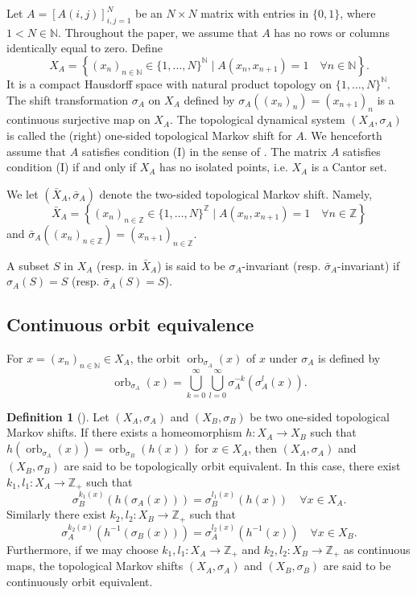 \documentclass[11pt]{article}
\theoremstyle{definition}
\newtheorem{definition}[theorem]{Definition}
\numberwithin{equation}{section}
\newcommand{\orb}{\operatorname{orb}}
\newcommand{\N}{\mathbb{N}}
\newcommand{\Z}{\mathbb{Z}}
\begin{document}
Let $A=[A(i,j)]_{i,j=1}^N$ be an $N\times N$ matrix with entries in $\{0,1\}$, 
where $1<N\in\N$. 
Throughout the paper, 
we assume that $A$ has no rows or columns identically equal to zero. 
Define 
\[
X_A=\left\{(x_n)_{n\in\N}\in\{1,\dots,N\}^\N\mid 
A(x_n,x_{n+1})=1\quad\forall n\in\N\right\}. 
\]
It is a compact Hausdorff space 
with natural product topology on $\{1,\dots,N\}^\N$. 
The shift transformation $\sigma_A$ on $X_A$ 
defined by $\sigma_A((x_n)_n)=(x_{n+1})_n$ is 
a continuous surjective map on $X_A$. 
The topological dynamical system $(X_A,\sigma_A)$ is called 
the (right) one-sided topological Markov shift for $A$. 
We henceforth assume that $A$ satisfies condition (I) 
in the sense of \cite{CK80Invent}. 
The matrix $A$ satisfies condition (I) if and only if 
$X_A$ has no isolated points, i.e. $X_A$ is a Cantor set. 

We let $(\bar X_A,\bar\sigma_A)$ denote 
the two-sided topological Markov shift. 
Namely, 
\[
\bar X_A=\left\{(x_n)_{n\in\Z}\in\{1,\dots,N\}^\Z\mid 
A(x_n,x_{n+1})=1\quad\forall n\in\Z\right\}
\]
and $\bar\sigma_A((x_n)_{n\in\Z})=(x_{n+1})_{n\in\Z}$. 

A subset $S$ in $X_A$ (resp. in $\bar X_A$) is said to be 
$\sigma_A$-invariant (resp. $\bar\sigma_A$-invariant) 
if $\sigma_A(S)=S$ (resp. $\bar\sigma_A(S)=S$). 




\subsection{Continuous orbit equivalence}




For $x=(x_n)_{n\in\N}\in X_A$, 
the orbit $\orb_{\sigma_A}(x)$ of $x$ under $\sigma_A$ is defined by 
\[
\orb_{\sigma_A}(x)=
\bigcup_{k=0}^\infty\bigcup_{l=0}^\infty\sigma_A^{-k}(\sigma_A^l(x)). 
\]

\begin{definition}[{\cite{Matsumoto10PJM}}]\label{defofcoe}
Let $(X_A,\sigma_A)$ and $(X_B,\sigma_B)$ be 
two one-sided topological Markov shifts. 
If there exists a homeomorphism $h:X_A\to X_B$ 
such that $h(\orb_{\sigma_A}(x))=\orb_{\sigma_B}(h(x))$ for $x\in X_A$, 
then $(X_A,\sigma_A)$ and $(X_B,\sigma_B)$ are said to be 
topologically orbit equivalent. 
In this case, there exist $k_1,l_1:X_A\to\Z_+$ such that 
\[
\sigma_B^{k_1(x)}(h(\sigma_A(x)))=\sigma_B^{l_1(x)}(h(x))
\quad\forall x\in X_A. 
\]
Similarly there exist $k_2,l_2:X_B\to\Z_+$ such that 
\[
\sigma_A^{k_2(x)}(h^{-1}(\sigma_B(x)))=\sigma_A^{l_2(x)}(h^{-1}(x))
\quad\forall x\in X_B. 
\]
Furthermore, 
if we may choose $k_1,l_1:X_A\to\Z_+$ and $k_2,l_2:X_B\to\Z_+$ 
as continuous maps, 
the topological Markov shifts $(X_A,\sigma_A)$ and $(X_B,\sigma_B)$ 
are said to be continuously orbit equivalent. 
\end{definition}
\end{document}
